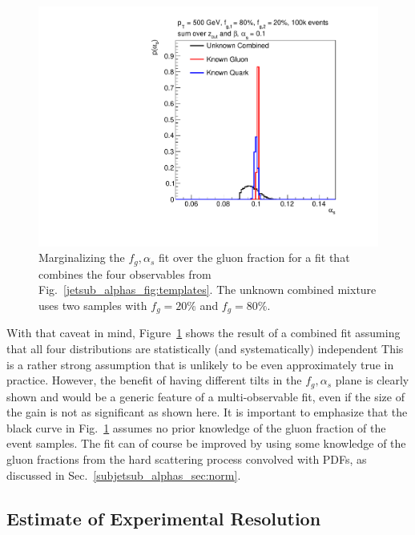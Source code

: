 \documentclass[11pt]{cernrep}
\begin{document}
\begin{figure}[t]
\begin{center}
\includegraphics[width = 0.49\columnwidth]{jetsub_alphas_combination23451324.pdf}
\end{center}
\caption{Marginalizing the $f_g,\alpha_s$ fit over the gluon fraction for a fit that combines the four observables from Fig.~\ref{jetsub_alphas_fig:templates}.  The unknown combined mixture uses two samples with $f_g=20\%$ and $f_g=80\%$.}
\label{jetsub_alphas_fig:combo}
\end{figure}

With that caveat in mind, Figure~\ref{jetsub_alphas_fig:combo} shows the result of a combined fit assuming that all four distributions are statistically (and systematically) independent
%
This is a rather strong assumption that is unlikely to be even approximately true in practice.
%
However, the benefit of having different tilts in the $f_g,\alpha_s$ plane is clearly shown and would be a generic feature of a multi-observable fit, even if the size of the gain is not as significant as shown here.
%
It is important to emphasize that the black curve in Fig.~\ref{jetsub_alphas_fig:combo} assumes no prior knowledge of the gluon fraction of the event samples.
%
The fit can of course be improved by using some knowledge of the gluon fractions from the hard scattering process convolved with PDFs, as discussed in Sec.~\ref{subjetsub_alphas_sec:norm}.


\subsection{Estimate of Experimental Resolution}
\label{jetsub_alphas_sec:resolution}
\end{document}
